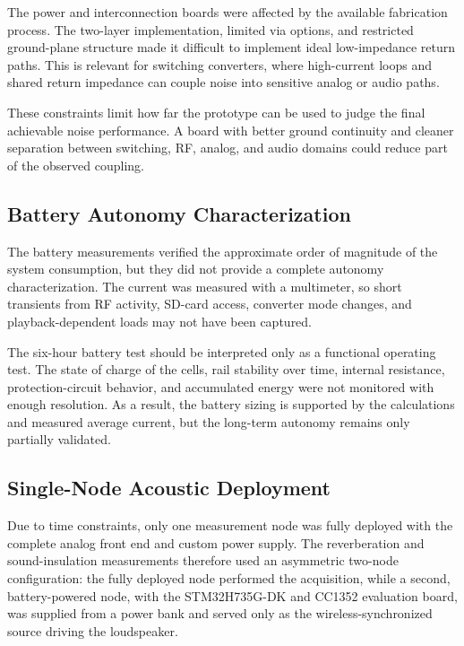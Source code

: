 The power and interconnection boards were affected by the available fabrication process. The two-layer implementation, limited via options, and restricted ground-plane structure made it difficult to implement ideal low-impedance return paths. This is relevant for switching converters, where high-current loops and shared return impedance can couple noise into sensitive analog or audio paths.

These constraints limit how far the prototype can be used to judge the final achievable noise performance. A board with better ground continuity and cleaner separation between switching, RF, analog, and audio domains could reduce part of the observed coupling.

\subsection{Battery Autonomy Characterization}

The battery measurements verified the approximate order of magnitude of the system consumption, but they did not provide a complete autonomy characterization. The current was measured with a multimeter, so short transients from RF activity, SD-card access, converter mode changes, and playback-dependent loads may not have been captured.

The six-hour battery test should be interpreted only as a functional operating test. The state of charge of the cells, rail stability over time, internal resistance, protection-circuit behavior, and accumulated energy were not monitored with enough resolution. As a result, the battery sizing is supported by the calculations and measured average current, but the long-term autonomy remains only partially validated.

\subsection{Single-Node Acoustic Deployment}
\label{sec:lim_single_node}

Due to time constraints, only one measurement node was fully deployed with the complete analog front end and custom power supply. The reverberation and sound-insulation measurements therefore used an asymmetric two-node configuration: the fully deployed node performed the acquisition, while a second, battery-powered node, with the STM32H735G-DK and CC1352 evaluation board, was supplied from a power bank and served only as the wireless-synchronized source driving the loudspeaker. 

